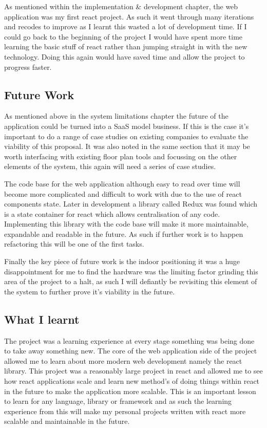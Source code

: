 As mentioned within the implementation \& development chapter, the web application was my first react project. As such it went through many iterations and recodes to improve as I learnt this wasted a lot of development time. If I could go back to the beginning of the project I would have spent more time learning the basic stuff of react rather than jumping straight in with the new technology. Doing this again would have saved time and allow the project to progress faster.

\subsection{Future Work}
As mentioned above in the system limitations chapter the future of the application could be turned into a SaaS model business. If this is the case it's important to do a range of case studies on existing companies to evaluate the viability of this proposal. It was also noted in the same section that it may be worth interfacing with existing floor plan tools and focussing on the other elements of the system, this again will need a series of case studies.

The code base for the web application although easy to read over time will become more complicated and difficult to work with due to the use of react components state. Later in development a library called Redux was found which is a state container for react which allows centralisation of any code. Implementing this library with the code base will make it more maintainable, expandable and readable in the future. As such if further work is to happen refactoring this will be one of the first tasks.

Finally the key piece of future work is the indoor positioning it was a huge disappointment for me to find the hardware was the limiting factor grinding this area of the project to a halt, as such I will defiantly be revisiting this element of the system to further prove it's viability in the future. 

\subsection{What I learnt} %
The project was a learning experience at every stage something was being done to take away something new. The core of the web application side of the project allowed me to learn about more modern web development namely the react library. This project was a reasonably large project in react and allowed me to see how react applications scale and learn new method's of doing things within react in the future to make the application more scalable. This is an important lesson to learn for any language, library or framework and as such the learning experience from this will make my personal projects written with react more scalable and maintainable in the future.


